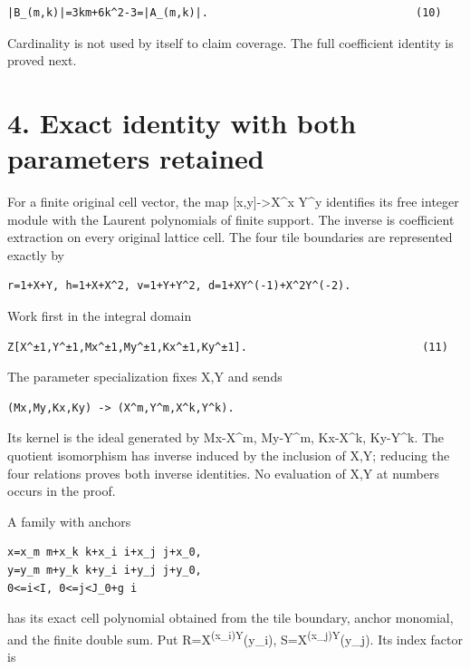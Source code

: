 \documentclass[
  10pt,
]{scrreprt}
\begin{document}
\begin{verbatim}
|B_(m,k)|=3km+6k^2-3=|A_(m,k)|.                                (10)
\end{verbatim}

Cardinality is not used by itself to claim coverage. The full
coefficient identity is proved next.

\section{4. Exact identity with both parameters
retained}\label{edition-11-section-7}

For a finite original cell vector, the map {[}x,y{]}-\textgreater X\^{}x
Y\^{}y identifies its free integer module with the Laurent polynomials
of finite support. The inverse is coefficient extraction on every
original lattice cell. The four tile boundaries are represented exactly
by

\begin{verbatim}
r=1+X+Y, h=1+X+X^2, v=1+Y+Y^2, d=1+XY^(-1)+X^2Y^(-2).
\end{verbatim}

Work first in the integral domain

\begin{verbatim}
Z[X^±1,Y^±1,Mx^±1,My^±1,Kx^±1,Ky^±1].                           (11)
\end{verbatim}

The parameter specialization fixes X,Y and sends

\begin{verbatim}
(Mx,My,Kx,Ky) -> (X^m,Y^m,X^k,Y^k).
\end{verbatim}

Its kernel is the ideal generated by Mx-X\^{}m, My-Y\^{}m, Kx-X\^{}k,
Ky-Y\^{}k. The quotient isomorphism has inverse induced by the inclusion
of X,Y; reducing the four relations proves both inverse identities. No
evaluation of X,Y at numbers occurs in the proof.

A family with anchors

\begin{verbatim}
x=x_m m+x_k k+x_i i+x_j j+x_0,
y=y_m m+y_k k+y_i i+y_j j+y_0,
0<=i<I, 0<=j<J_0+g i
\end{verbatim}

has its exact cell polynomial obtained from the tile boundary, anchor
monomial, and the finite double sum. Put
R=X\textsuperscript{(x\_i)Y}(y\_i), S=X\textsuperscript{(x\_j)Y}(y\_j).
Its index factor is
\end{document}
